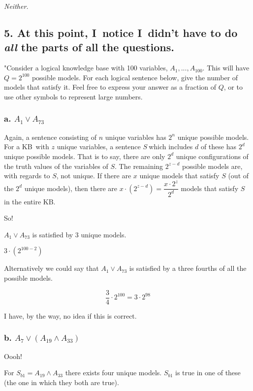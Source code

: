 \documentclass{article}
\begin{document}
\textit{Neither.}

\subsection{5. At this point, I\ notice I\ didn't have to do \textit{all}
the parts of all the questions.}

"Consider a logical knowledge base with 100 variables, $A_{1},...,A_{100}$.
This will have $Q=2^{100}$ possible models. For each logical sentence below,
give the number of models that satisfy it. Feel free to express your answer
as a fraction of $Q$, or to use other symbols to represent large numbers.

\subsubsection{a. $A_{1}\vee A_{73}$}

Again, a sentence consisting of $n$ unique variables has $2^{n}$ unique
possible models. For a KB\ with $z$ unique variables, a sentence $S\ $which
includes $d$ of these has $2^{d}$ unique possible models. That is to say,
there are only $2^{d}$ unique configurations of the truth values of the
variables of $S$. The remaining $2^{z-d}$ possible models are, with regards
to $S$, not unique. If there are $x$ unique models that satisfy $S$ (out of
the $2^{d}$ unique models), then there are $x\cdot \left( 2^{z-d}\right) =%
\dfrac{x\cdot 2^{z}}{2^{d}}$ models that satisfy $S$ in the entire KB.

So!

$A_{1}\vee A_{73}$ is satisfied by $3$ unique models.

$3\cdot \left( 2^{100-2}\right) $

Alternatively we could say that $A_{1}\vee A_{73}$ is satisfied by a three
fourths of all the possible models.

\[
\dfrac{3}{4}\cdot 2^{100}=3\cdot 2^{98}
\]

I have, by the way, no idea if this is correct.

\subsubsection{b. $A_{7}\vee \left( A_{19}\wedge A_{33}\right) $}

Oooh!

For $S_{b1}=A_{19}\wedge A_{33}$ there exists four unique models. $S_{b1}$
is true in one of these (the one in which they both are true).
\end{document}
